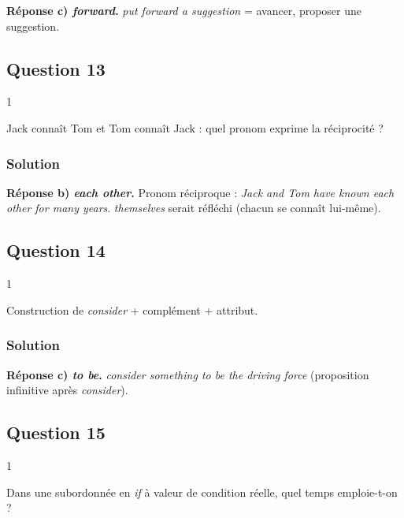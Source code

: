 \documentclass[11pt,a4paper]{article}
\begin{document}
\textbf{Réponse c) \emph{forward}.} \emph{put forward a suggestion} = avancer, proposer une suggestion.

\hypertarget{question-13}{%
\subsection{Question 13}\label{question-13}}

\begin{indication}{1}

Jack connaît Tom et Tom connaît Jack : quel pronom exprime la réciprocité ?

\end{indication}

\hypertarget{solution-12}{%
\subsubsection{Solution}\label{solution-12}}

\textbf{Réponse b) \emph{each other}.} Pronom réciproque : \emph{Jack and Tom have known each other for many years}. \emph{themselves} serait réfléchi (chacun se connaît lui-même).

\hypertarget{question-14}{%
\subsection{Question 14}\label{question-14}}

\begin{indication}{1}

Construction de \emph{consider} + complément + attribut.

\end{indication}

\hypertarget{solution-13}{%
\subsubsection{Solution}\label{solution-13}}

\textbf{Réponse c) \emph{to be}.} \emph{consider something to be the driving force} (proposition infinitive après \emph{consider}).

\hypertarget{question-15}{%
\subsection{Question 15}\label{question-15}}

\begin{indication}{1}

Dans une subordonnée en \emph{if} à valeur de condition réelle, quel temps emploie-t-on ?

\end{indication}
\end{document}
